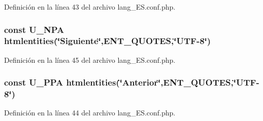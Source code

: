 Definición en la línea 43 del archivo lang\-\_\-\-E\-S.\-conf.\-php.

\hypertarget{lang__ES_8conf_8php_a1a03538e3e8586eb7532f569d9c62a75}{
\subsubsection[{U\-\_\-\-N\-P\-A}]{\setlength{\rightskip}{0pt plus 5cm}const U\-\_\-\-N\-P\-A htmlentities(\char`\"{}Siguiente\char`\"{},E\-N\-T\-\_\-\-Q\-U\-O\-T\-E\-S,\char`\"{}U\-T\-F-\/8\char`\"{})}}\label{lang__ES_8conf_8php_a1a03538e3e8586eb7532f569d9c62a75}


Definición en la línea 45 del archivo lang\-\_\-\-E\-S.\-conf.\-php.

\hypertarget{lang__ES_8conf_8php_a8980fc01853b6478780875fe230eb9d2}{
\subsubsection[{U\-\_\-\-P\-P\-A}]{\setlength{\rightskip}{0pt plus 5cm}const U\-\_\-\-P\-P\-A htmlentities(\char`\"{}Anterior\char`\"{},E\-N\-T\-\_\-\-Q\-U\-O\-T\-E\-S,\char`\"{}U\-T\-F-\/8\char`\"{})}}\label{lang__ES_8conf_8php_a8980fc01853b6478780875fe230eb9d2}


Definición en la línea 44 del archivo lang\-\_\-\-E\-S.\-conf.\-php.

